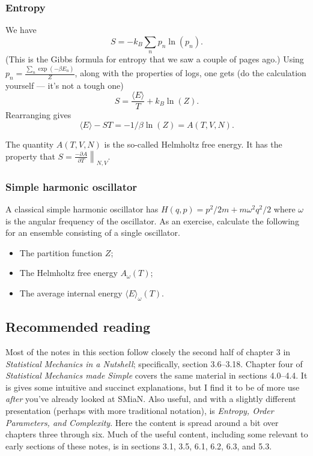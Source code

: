 \subsubsection{Entropy}
We have
$$
	S = -k_B\sum_n p_n\ln(p_n).
$$
(This is the Gibbs formula for entropy that we saw a couple of pages ago.) Using $p_n = \frac{\sum_n \exp(-\beta E_n)}{Z}$, along with the properties of logs, one gets (do the calculation yourself --- it's not a tough one)
$$
	S = \frac{\langle E \rangle}{T} +k_B\ln(Z).
$$
Rearranging gives
$$
	\langle E \rangle -ST = -1/\beta \ln(Z) = A(T,V,N).
$$

The quantity $A(T,V,N)$ is the so-called Helmholtz free energy. It has the property that $S = \left.\frac{-\partial A}{\partial T}\right\|_{N,V}$.

\subsubsection{Simple harmonic oscillator}
A classical simple harmonic oscillator has $H(q,p) =p^2/2m + m\omega^2q^2/2$ where $\omega$ is the angular frequency of the oscillator. As an exercise, calculate the following for an ensemble consisting of a single oscillator.
\begin{itemize}
	\item The partition function $Z$;
	\item The Helmholtz free energy $A_{\omega}(T)$;
	\item The average internal energy $\langle E \rangle_{\omega}(T)$.
\end{itemize}

\subsection{Recommended reading}
Most of the notes in this section follow closely the second half of chapter 3 in \emph{Statistical Mechanics in a Nutshell}; specifically, section 3.6--3.18. Chapter four of \emph{Statistical Mechanics made Simple} covers the same material in sections 4.0--4.4. It is gives some intuitive and succinct explanations, but I find it to be of more use \emph{after} you've already looked at SMiaN. Also useful, and with a slightly different presentation (perhaps with more traditional notation), is \emph{Entropy, Order Parameters, and Complexity}. Here the content is spread around a bit over chapters three through six. Much of the useful content, including some relevant to early sections of these notes, is in sections 3.1, 3.5, 6.1, 6.2, 6.3, and 5.3.
